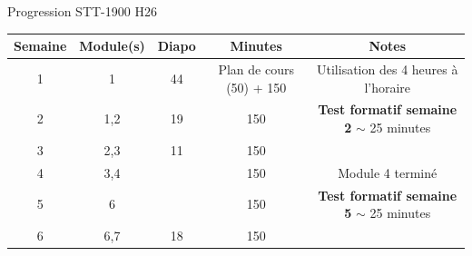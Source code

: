 \documentclass[12pt,french]{article}
\begin{document}
\Large{Progression STT-1900 H26}


\begin{table}[h]
    \centering
    \begin{tabular}{|c|c|c|c|c|}
    \hline
       Semaine  & Module(s) & Diapo & Minutes & Notes \\
       \hline
        1   & 1 & 44 & Plan de cours (50) + 150 & Utilisation des 4 heures à l'horaire\\
        \hline
        2 &1,2 &19 & 150& \textbf{Test formatif semaine 2} $\sim$ 25 minutes \\
        \hline
         3 &2,3 &11 & 150&  \\
        \hline
         4 &3,4 &  & 150& Module 4 terminé \\
        \hline
        5 &6 &  & 150& \textbf{Test formatif semaine 5} $\sim$ 25 minutes \\
        \hline
        6 &6,7 &18  & 150&  \\
        \hline        
    \end{tabular}

\end{table}
\end{document}
